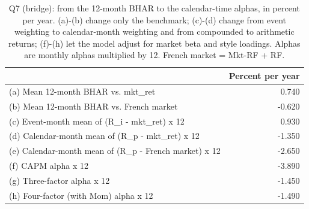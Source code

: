 \begin{table}
\caption{Q7 (bridge): from the 12-month BHAR to the calendar-time alphas, in percent per year. (a)-(b) change only the benchmark; (c)-(d) change from event weighting to calendar-month weighting and from compounded to arithmetic returns; (f)-(h) let the model adjust for market beta and style loadings. Alphas are monthly alphas multiplied by 12. French market = Mkt-RF + RF.}
\label{tab:q7}
\begin{tabular}{p{9cm}r}
\toprule
 & Percent per year \\
\midrule
(a) Mean 12-month BHAR vs. mkt\_ret & 0.740 \\
(b) Mean 12-month BHAR vs. French market & -0.620 \\
(c) Event-month mean of (R\_i - mkt\_ret) x 12 & 0.930 \\
(d) Calendar-month mean of (R\_p - mkt\_ret) x 12 & -1.350 \\
(e) Calendar-month mean of (R\_p - French market) x 12 & -2.650 \\
(f) CAPM alpha x 12 & -3.890 \\
(g) Three-factor alpha x 12 & -1.450 \\
(h) Four-factor (with Mom) alpha x 12 & -1.490 \\
\bottomrule
\end{tabular}
\end{table}
